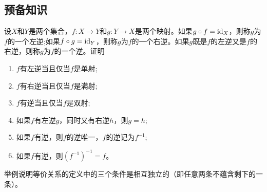 \subsection{预备知识}
\begin{prob}
设$X$和$Y$是两个集合，$f:X\rightarrow Y$和$g:Y\rightarrow X$是两个映射。如果$g\circ f={\rm id}_{X}$，则称$g$为$f$的一个{\heiti 左逆};如果$f\circ g={\rm id}_{Y}$，则称$g$为$f$的一个{\heiti 右逆}。如果$g$既是$f$的左逆又是$f$的右逆，则称$g$为$f$的一个{\heiti 逆}。证明
\begin{enumerate}[$(1)$]
\item $f$有左逆当且仅当$f$是单射;
\item $f$有右逆当且仅当$f$是满射;
\item $f$有逆当且仅当$f$是双射;
\item 如果$f$有左逆$g$，同时又有右逆$h$，则$g=h$;
\item 如果$f$有逆，则$f$的逆唯一，$f$的逆记为$f^{-1}$;
\item 如果$f$有逆，则$\left(f^{-1}\right)^{-1}=f$。
\end{enumerate}
\end{prob}

\begin{prob}
举例说明等价关系的定义中的三个条件是相互独立的（即任意两条不蕴含剩下的一条）。
\end{prob}